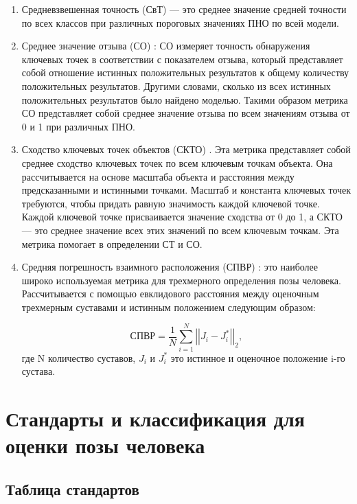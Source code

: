 \begin{enumerate}[label=\arabic*)]
	\item Средневзвешенная точность (СвТ) \cite{guide-hpe} --- это среднее значение средней точности по всех классов при различных пороговых значениях ПНО по всей модели.
	
	\item Среднее значение отзыва (СО) \cite{guide-hpe}: СО измеряет точность обнаружения ключевых точек в соответствии с показателем отзыва, который представляет собой отношение истинных положительных результатов к общему количеству положительных результатов.
	Другими словами, сколько из всех истинных положительных результатов было найдено моделью.
	Такими образом метрика СО представляет собой среднее значение отзыва по всем значениям отзыва от 0 и 1 при различных ПНО.
	
	\item Сходство ключевых точек объектов (СКТО) \cite{COCO}. Эта метрика представляет собой среднее сходство ключевых точек по всем ключевым точкам объекта.
	Она рассчитывается на основе масштаба объекта и расстояния между предсказанными и истинными точками.
	Масштаб и константа ключевых точек требуются, чтобы придать равную значимость каждой ключевой точке.
	Каждой ключевой точке присваивается значение сходства от 0 до 1, а СКТО --- это среднее значение всех этих значений по всем ключевым точкам.
	Эта метрика помогает в определении СТ и СО.
	
	\item Средняя погрешность взаимного расположения (СПВР) \cite{COCO}: это наиболее широко используемая метрика для трехмерного определения позы человека.
	Рассчитывается с помощью евклидового расстояния между оценочным трехмерным суставами и истинным положением следующим образом:
	
	\begin{equation}
		\text{СПВР} = \frac{1}{N}\sum_{i=1}^{N} \left| \left| J_i -J_i^*\right| \right|_2,
	\end{equation}
	где N количество суставов, $J_i$ и $J_i^*$ это истинное и оценочное положение i-го сустава.
\end{enumerate}

\section{Стандарты и классификация для оценки позы человека}

\subsection{Таблица стандартов}

